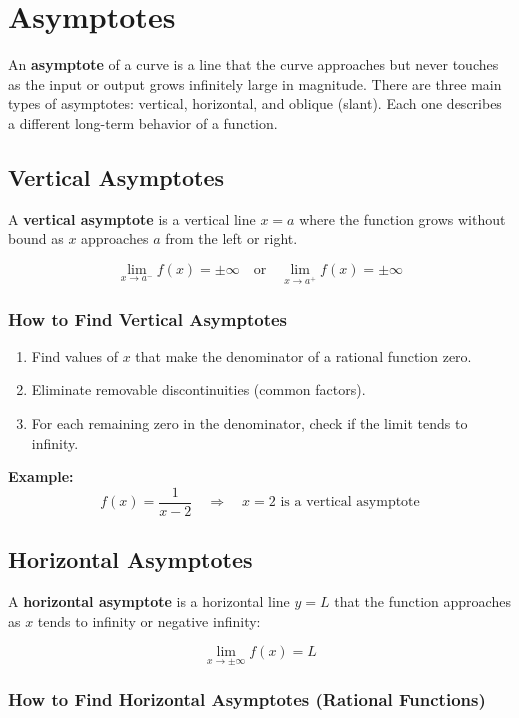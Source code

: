 \section{Asymptotes}

An \textbf{asymptote} of a curve is a line that the curve approaches but never touches as the input or output grows infinitely large in magnitude. There are three main types of asymptotes: vertical, horizontal, and oblique (slant). Each one describes a different long-term behavior of a function.

\subsection{Vertical Asymptotes}

A \textbf{vertical asymptote} is a vertical line \(x = a\) where the function grows without bound as \(x\) approaches \(a\) from the left or right.

\[
\lim_{x \to a^-} f(x) = \pm \infty \quad \text{or} \quad \lim_{x \to a^+} f(x) = \pm \infty
\]

\subsubsection{How to Find Vertical Asymptotes}

\begin{enumerate}
    \item Find values of \(x\) that make the denominator of a rational function zero.
    \item Eliminate removable discontinuities (common factors).
    \item For each remaining zero in the denominator, check if the limit tends to infinity.
\end{enumerate}

\textbf{Example:}
\[
f(x) = \frac{1}{x - 2} \quad \Rightarrow \quad x = 2 \text{ is a vertical asymptote}
\]

\subsection{Horizontal Asymptotes}

A \textbf{horizontal asymptote} is a horizontal line \(y = L\) that the function approaches as \(x\) tends to infinity or negative infinity:

\[
\lim_{x \to \pm\infty} f(x) = L
\]

\subsubsection{How to Find Horizontal Asymptotes (Rational Functions)}

